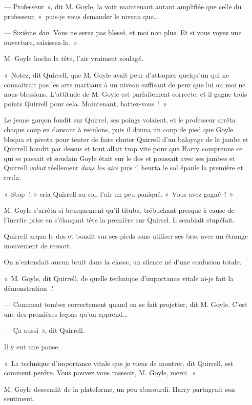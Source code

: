 --- Professeur~», dit M. Goyle, la voix maintenant autant amplifiée que celle du professeur, «~puis-je vous demander le niveau que…

--- Sixième \emph{dan}.
Vous ne serez pas blessé, et moi non plus.
Et si vous voyez une ouverture, saisissez-la.~»

M. Goyle hocha la tête, l'air vraiment soulagé.

«~Notez, dit Quirrell, que M. Goyle avait peur d'attaquer quelqu'un qui ne connaitrait pas les arts martiaux à un niveau suffisant de peur que lui ou moi ne nous blessions.
L'attitude de M. Goyle est parfaitement correcte, et il gagne trois points Quirrell pour cela.
Maintenant, battez-vous~!~»

Le jeune garçon fondit sur Quirrel, ses poings volaient, et le professeur arrêta chaque coup en dansant à reculons, puis il donna un coup de pied que Goyle bloqua et pivota pour tenter de faire chuter Quirrell d'un balayage de la jambe et Quirrell bondit par dessus et tout allait trop vite pour que Harry comprenne ce qui se passait et soudain Goyle était sur le dos et poussait avec ses jambes et Quirrell \emph{volait} réellement \emph{dans les airs} puis il heurta le sol épaule la première et roula.

«~Stop~!~» cria Quirrell au sol, l'air un peu paniqué.
«~Vous avez gagné~!~»

M. Goyle s'arrêta si brusquement qu'il tituba, trébuchant presque à cause de l'inertie prise en s'élançant tête la première sur Quirrel.
Il semblait stupéfait.

Quirrell arqua le dos et bondit sur ses pieds sans utiliser ses bras avec un étrange mouvement de ressort.

On n'entendait aucun bruit dans la classe, un silence né d'une confusion totale.

«~M. Goyle, dit Quirrell, de quelle technique d'importance vitale ai-je fait la démonstration~?

--- Comment tomber correctement quand on se fait projetter, dit M. Goyle.
C'est une des premières leçons qu'on apprend…

--- Ça aussi~», dit Quirrell.

Il y eut une pause.

«~La technique d'importance vitale que je viens de montrer, dit Quirrell, est comment perdre.
Vous pouvez vous rasseoir, M. Goyle, merci.~»

M. Goyle descendit de la plateforme, un peu abasourdi.
Harry partageait son sentiment.

